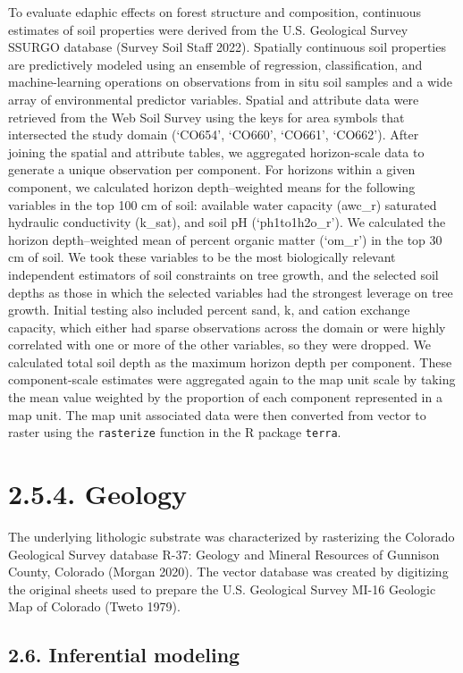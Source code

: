 \documentclass[
  12pt,
]{article}
\begin{document}
To evaluate edaphic effects on forest structure and composition,
continuous estimates of soil properties were derived from the U.S.
Geological Survey SSURGO database (Survey Soil Staff 2022). Spatially
continuous soil properties are predictively modeled using an ensemble of
regression, classification, and machine-learning operations on
observations from in situ soil samples and a wide array of environmental
predictor variables. Spatial and attribute data were retrieved from the
Web Soil Survey using the keys for area symbols that intersected the
study domain (`CO654', `CO660', `CO661', `CO662'). After joining the
spatial and attribute tables, we aggregated horizon-scale data to
generate a unique observation per component. For horizons within a given
component, we calculated horizon depth--weighted means for the following
variables in the top 100 cm of soil: available water capacity (awc\_r)
saturated hydraulic conductivity (k\_sat), and soil pH (`ph1to1h2o\_r').
We calculated the horizon depth--weighted mean of percent organic matter
(`om\_r') in the top 30 cm of soil. We took these variables to be the
most biologically relevant independent estimators of soil constraints on
tree growth, and the selected soil depths as those in which the selected
variables had the strongest leverage on tree growth. Initial testing
also included percent sand, k, and cation exchange capacity, which
either had sparse observations across the domain or were highly
correlated with one or more of the other variables, so they were
dropped. We calculated total soil depth as the maximum horizon depth per
component. These component-scale estimates were aggregated again to the
map unit scale by taking the mean value weighted by the proportion of
each component represented in a map unit. The map unit associated data
were then converted from vector to raster using the \texttt{rasterize}
function in the R package \texttt{terra}.

\section{2.5.4. Geology}\label{geology}

The underlying lithologic substrate was characterized by rasterizing the
Colorado Geological Survey database R-37: Geology and Mineral Resources
of Gunnison County, Colorado (Morgan 2020). The vector database was
created by digitizing the original sheets used to prepare the U.S.
Geological Survey MI-16 Geologic Map of Colorado (Tweto 1979).

\subsection{2.6. Inferential modeling}\label{inferential-modeling}
\end{document}
